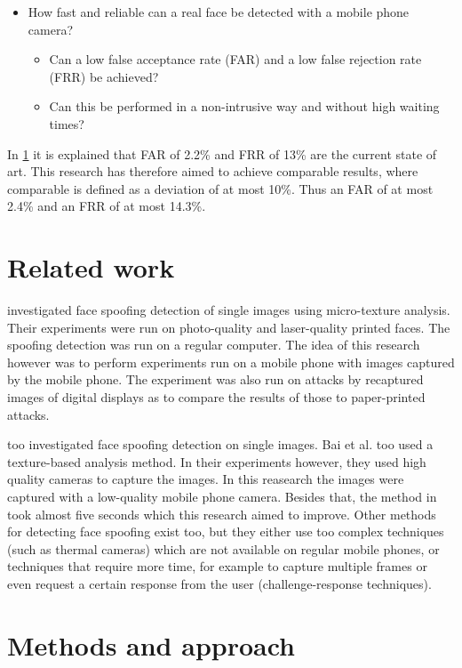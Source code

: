 \documentclass{sig-alternate-br}
\begin{document}
\begin{itemize}
	\item How fast and reliable can a real face be detected with a mobile phone camera?
	\begin{itemize}
		\item Can a low false acceptance rate (FAR) and a low false rejection rate (FRR) be achieved?
		\item Can this be performed in a non-intrusive way and without high waiting times?
	\end{itemize}
\end{itemize}
In \ref{related} it is explained that FAR of 2.2\% and FRR of 13\% are the current state of art. This research has therefore aimed to achieve comparable results, where comparable is defined as a deviation of at most 10\%. Thus an FAR of at most 2.4\% and an FRR of at most 14.3\%.

\section{Related work} \label{related}
\cite{maatta2011face} investigated face spoofing detection of single images using micro-texture analysis. Their experiments were run on photo-quality and laser-quality printed faces. The spoofing detection was run on a regular computer. The idea of this research however was to perform experiments run on a mobile phone with images captured by the mobile phone. The experiment was also run on attacks by recaptured images of digital displays as to compare the results of those to paper-printed attacks.

\cite{bai2010physics} too investigated face spoofing detection on single images. Bai et al. too used a texture-based analysis method. In their experiments however, they used high quality cameras to capture the images. In this reasearch the images were captured with a low-quality mobile phone camera. Besides that, the method in \cite{bai2010physics} took almost five seconds which this research aimed to improve.
Other methods for detecting face spoofing exist too, but they either use too complex techniques (such as thermal cameras) which are not available on regular mobile phones, or techniques that require more time, for example to capture multiple frames or even request a certain response from the user (challenge-response techniques).

\section{Methods and approach} \label{methods}
\end{document}
